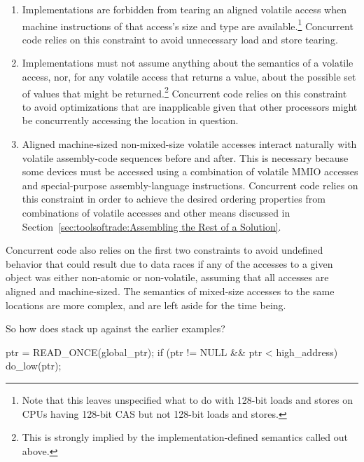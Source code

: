 \begin{enumerate}
\item	Implementations are forbidden from tearing an aligned volatile
	access when machine instructions of that access's size and type
	are available.\footnote{
		Note that this leaves unspecified what to do with 128-bit
		loads and stores on CPUs having 128-bit CAS but not
		128-bit loads and stores.}
	Concurrent code relies on this constraint to avoid unnecessary
	load and store tearing.
\item	Implementations must not assume anything about the semantics of
	a volatile access, nor, for any volatile access that returns a
	value, about the possible set of values that might be
	returned.\footnote{
		This is strongly implied by the implementation-defined
		semantics called out above.}
	Concurrent code relies on this constraint to avoid optimizations
	that are inapplicable given that other processors might be
	concurrently accessing the location in question.
\item	Aligned machine-sized non-mixed-size volatile accesses interact
	naturally with volatile assembly-code sequences before and after.
	This is necessary because some devices must be accessed using
	a combination of volatile MMIO accesses and special-purpose
	assembly-language instructions.
	Concurrent code relies on this constraint in order to achieve
	the desired ordering properties from combinations of volatile
	accesses and other means discussed in
	Section~\ref{sec:toolsoftrade:Assembling the Rest of a Solution}.
\end{enumerate}

Concurrent code also relies on the first two constraints to avoid
undefined behavior that could result due to data races if any of the
accesses to a given object was either non-atomic or non-volatile,
assuming that all accesses are aligned and machine-sized.
The semantics of mixed-size accesses to the same locations are more
complex, and are left aside for the time being.

So how does  stack up against the earlier examples?

\begin{listing}[tbp]
\begin{fcvlabel}
\begin{VerbatimL}[commandchars=\\\{\}]
ptr = READ_ONCE(global_ptr);
if (ptr != NULL && ptr < high_address)
	do_low(ptr);
\end{VerbatimL}
\end{fcvlabel}
\caption{Avoiding Danger, 2018 Style}
\label{lst:toolsoftrade:Avoiding Danger, 2018 Style}
\end{listing}

